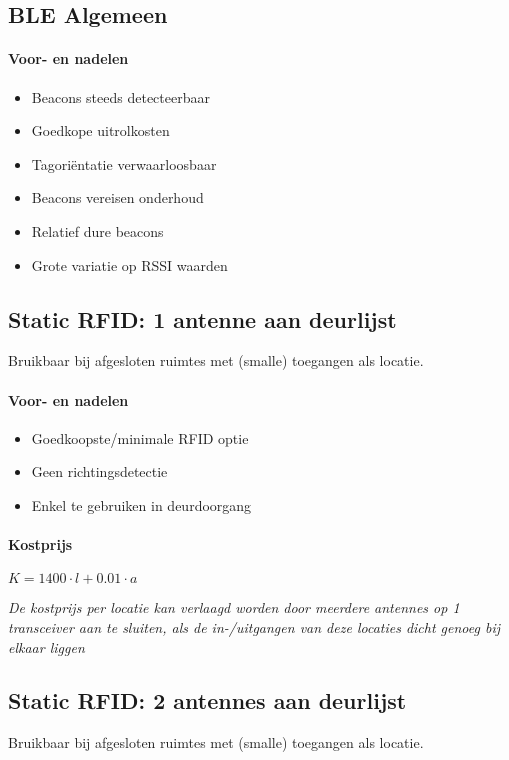 \subsection{BLE Algemeen}
\label{sec:con-ant-BLE}
\paragraph{Voor- en nadelen}
\begin{itemize}
	\color{ForestGreen}
	\item Beacons steeds detecteerbaar
	\item Goedkope uitrolkosten
	\item Tagoriëntatie verwaarloosbaar
	\color{RedOrange}
	\item Beacons vereisen onderhoud
	\item Relatief dure beacons
	\item Grote variatie op RSSI waarden
\end{itemize}

\subsection{Static RFID: 1 antenne aan deurlijst}
Bruikbaar bij afgesloten ruimtes met (smalle) toegangen als locatie.
\paragraph{Voor- en nadelen}
\begin{itemize}
\color{ForestGreen}
\item Goedkoopste/minimale RFID optie
\color{RedOrange}
\item Geen richtingsdetectie
\item Enkel te gebruiken in deurdoorgang
\end{itemize}
\paragraph{Kostprijs}
\(K = 1400 \cdot l + 0.01 \cdot a\)

\emph{De kostprijs per locatie kan verlaagd worden door meerdere antennes op 1 transceiver aan te sluiten, als de in-/uitgangen van deze locaties dicht genoeg bij elkaar liggen}

\subsection{Static RFID: 2 antennes aan deurlijst}
Bruikbaar bij afgesloten ruimtes met (smalle) toegangen als locatie.
